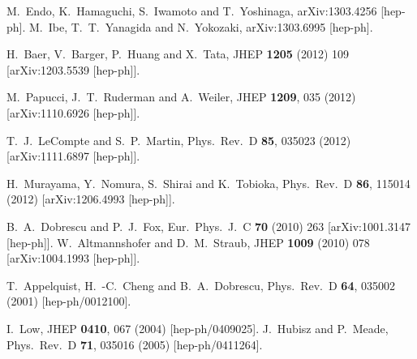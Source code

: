 \begin{thebibliography}{99}
  M.~Endo, K.~Hamaguchi, S.~Iwamoto and T.~Yoshinaga,
  arXiv:1303.4256 [hep-ph].
  M.~Ibe, T.~T.~Yanagida and N.~Yokozaki,
  arXiv:1303.6995 [hep-ph].


  H.~Baer, V.~Barger, P.~Huang and X.~Tata,
  JHEP {\bf 1205} (2012) 109
  [arXiv:1203.5539 [hep-ph]].

  M.~Papucci, J.~T.~Ruderman and A.~Weiler,
  JHEP {\bf 1209}, 035 (2012)
  [arXiv:1110.6926 [hep-ph]].

  T.~J.~LeCompte and S.~P.~Martin,
  Phys.\ Rev.\ D {\bf 85}, 035023 (2012)
  [arXiv:1111.6897 [hep-ph]].

  H.~Murayama, Y.~Nomura, S.~Shirai and K.~Tobioka,
  Phys.\ Rev.\ D {\bf 86}, 115014 (2012)
  [arXiv:1206.4993 [hep-ph]].



  B.~A.~Dobrescu and P.~J.~Fox,
  Eur.\ Phys.\ J.\ C {\bf 70} (2010) 263
  [arXiv:1001.3147 [hep-ph]].
  W.~Altmannshofer and D.~M.~Straub,
  JHEP {\bf 1009} (2010) 078
  [arXiv:1004.1993 [hep-ph]].



  T.~Appelquist, H.~-C.~Cheng and B.~A.~Dobrescu,
  Phys.\ Rev.\ D {\bf 64}, 035002 (2001)
  [hep-ph/0012100].

  I.~Low,
  JHEP {\bf 0410}, 067 (2004)
  [hep-ph/0409025].
  J.~Hubisz and P.~Meade,
  Phys.\ Rev.\ D {\bf 71}, 035016 (2005)
  [hep-ph/0411264].


\end{thebibliography}
